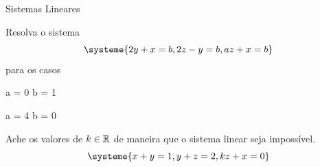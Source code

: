 \begin{exercicios}{Sistemas Lineares}
    \begin{exercicio}
        Resolva o sistema
        \[\systeme{
            2y + x = b,
            2z - y = b,
            az + x = b}
        \]
        para os casos
        \begin{mathlist}[2]
            \item a = 0  b = 1
            \item a = 4  b = 0
        \end{mathlist}		
    \end{exercicio}
    
    \begin{exercicio}
        Ache os valores de $k \in \mathbb{R}$ de maneira que o sistema linear seja impossível.
        \[\systeme{
             x + y = 1,
             y + z = 2,
            kz + x = 0}
        \]
    \end{exercicio}
    
\end{exercicios} %

